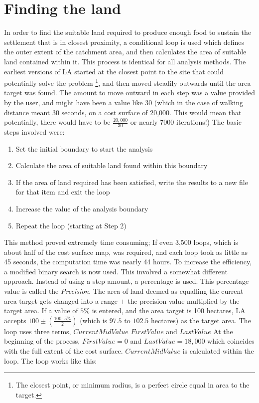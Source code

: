 \section{Finding the land} 

In order to find the suitable land required to produce enough food to sustain
the settlement that is in closest proximity, a conditional loop is used which
defines the outer extent of the catchment area, and then calculates the area of
suitable land contained within it.  This process is identical for all analysis
methods.  The earliest versions of LA started at the closest point to the site
that could potentially solve the problem \footnote{The closest point, or
minimum radius, is a perfect circle equal in area to the target.}, and then
moved steadily outwards until the area target was found.  The amount to move
outward in each step was a value provided by the user, and might have been a
value like 30 (which in the case of walking distance meant 30 seconds, on  a
cost surface of 20,000.  This would mean that potentially, there would have to
be $\frac{20,000}{30}$ or nearly 7000 iterations!)
The basic steps involved were:

   \begin{enumerate} 
   
   \item  Set the initial boundary to start the analysis
   
   \item  Calculate the area of suitable land found within this boundary 
   
   \item If the area of land required has been satisfied, write the results to
   a new file for that item and exit the loop 
   
   \item  Increase the value of the analysis boundary 
   
   \item  Repeat the loop (starting at Step 2)
   
   \end{enumerate}

This method proved extremely time consuming;  If even 3,500 loops, which is
about half of the cost surface map, was required, and each loop took as little
as 45 seconds, the computation time was nearly 44 hours.   To increase the
efficiency, a modified binary search is now used.  This involved a somewhat
different approach.  Instead of using a step amount, a percentage is used.
This percentage value is called the \textit{Precision}. 
The area of land deemed as equalling the current area target gets changed into
a range $\pm$ the precision value multiplied by the target area. 
If a value of $5\%$ is entered, and the area
target is 100 hectares, LA accepts $100 \pm(\frac{100 \cdot
5\%}{2})$ (which is $97.5$ to $102.5$ hectares) as the target area.  The loop
uses three terms, $CurrentMidValue$ $FirstValue$ and $LastValue$ At the
beginning of the process, $FirstValue=0$ and $LastValue=18,000$ which coincides
with the full extent of the cost surface.  $CurrentMidValue$ is calculated
within the loop.  The loop works like this:

